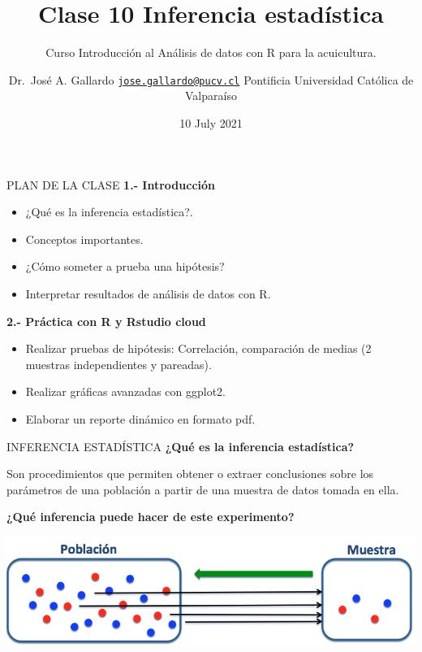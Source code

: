 \documentclass[
  ignorenonframetext,
]{beamer}
\title{Clase 10 Inferencia estadística}
\subtitle{Curso Introducción al Análisis de datos con R para la
acuicultura.}
\author{Dr.~José A. Gallardo \textbar{}
\href{mailto:jose.gallardo@pucv.cl}{\nolinkurl{jose.gallardo@pucv.cl}}
\textbar{} Pontificia Universidad Católica de Valparaíso}
\date{10 July 2021}
\providecommand{\tightlist}{%
  \setlength{\itemsep}{0pt}\setlength{\parskip}{0pt}}
\begin{document}
\frame{\titlepage}

\begin{frame}{PLAN DE LA CLASE}
\protect\hypertarget{plan-de-la-clase}{}
\textbf{1.- Introducción}

\begin{itemize}
\tightlist
\item
  ¿Qué es la inferencia estadística?.\\
\item
  Conceptos importantes.
\item
  ¿Cómo someter a prueba una hipótesis?
\item
  Interpretar resultados de análisis de datos con R.
\end{itemize}

\textbf{2.- Práctica con R y Rstudio cloud}

\begin{itemize}
\tightlist
\item
  Realizar pruebas de hipótesis: Correlación, comparación de medias (2
  muestras independientes y pareadas).
\item
  Realizar gráficas avanzadas con ggplot2.
\item
  Elaborar un reporte dinámico en formato pdf.
\end{itemize}
\end{frame}

\begin{frame}{INFERENCIA ESTADÍSTICA}
\protect\hypertarget{inferencia-estaduxedstica}{}
\textbf{¿Qué es la inferencia estadística?}

Son procedimientos que permiten obtener o extraer conclusiones sobre los
parámetros de una población a partir de una muestra de datos tomada en
ella.

\textbf{¿Qué inferencia puede hacer de este experimento?}

\includegraphics[width=1\linewidth]{Inferencia}
\end{frame}
\end{document}
